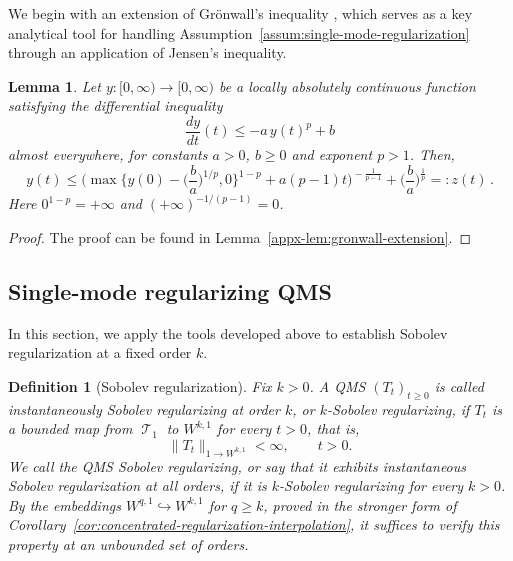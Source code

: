 \documentclass[11pt]{article}
\theoremstyle{myplain}
\newtheorem{lem}[lem]{Lemma}
\theoremstyle{mydefinition}
\newtheorem{defi}[defi]{Definition}
\theoremstyle{remark}
\DeclareMathOperator{\cT}{\mathcal{T}}
\DeclareMathOperator{\1}{\mathds{1}}
\begin{document}
    We begin with an extension of Gr\"{o}nwall's inequality \cite{Gronwall.1919}, which serves as a key analytical tool for handling Assumption~\ref{assum:single-mode-regularization} through an application of Jensen's inequality.

    \begin{lem}\label{lem:gronwall-extension}
        Let $y : [0, \infty) \to [0, \infty)$ be a locally absolutely continuous function satisfying the differential inequality
        \begin{equation*}
            \frac{dy}{dt}(t) \le -a\, y(t)^p + b
        \end{equation*}
        almost everywhere, for constants $a>0$, $b\geq0$ and exponent $p > 1$. Then,
        \begin{equation*}
            y(t) \le \bigg(\max\{y(0) - \Big(\frac{b}{a}\Big)^{1/p}, 0\}^{1 - p} + a(p - 1)t \bigg)^{\!-\frac{1}{p - 1}} + \Big(\frac{b}{a}\Big)^{\!\frac{1}{p}} =: z(t) \, .
        \end{equation*}
        Here $0^{1-p}=+\infty$ and $(+\infty)^{-1/(p-1)}=0$.
    \end{lem}
    \begin{proof}
        The proof can be found in Lemma~\ref{appx-lem:gronwall-extension}.
    \end{proof}

    \subsection{Single-mode regularizing QMS}\label{subsec:single-mode-regularizing}
        In this section, we apply the tools developed above to establish Sobolev regularization at a fixed order $k$.
        
        \begin{defi}[Sobolev regularization]\label{def:sobolev-regularizing-QMS}
            Fix $k > 0$. A QMS $(T_t)_{t \geq 0}$ is called \emph{instantaneously Sobolev regularizing at order $k$}, or \emph{$k$-Sobolev regularizing}, if $T_t$ is a bounded map from $\cT_1$ to $W^{k,1}$ for every $t > 0$, that is,
            \begin{equation}\label{eq:sobolev-regularizing}
                \|T_t\|_{1 \to W^{k,1}} < \infty,\qquad t > 0.
            \end{equation}
            We call the QMS \emph{Sobolev regularizing}, or say that it exhibits \emph{instantaneous Sobolev regularization at all orders}, if it is $k$-Sobolev regularizing for every $k > 0$. By the embeddings $W^{q,1} \hookrightarrow W^{k,1}$ for $q \geq k$, proved in the stronger form of Corollary~\ref{cor:concentrated-regularization-interpolation}, it suffices to verify this property at an unbounded set of orders.
        \end{defi}
        
\end{document}

